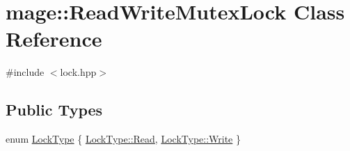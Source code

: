 \hypertarget{classmage_1_1_read_write_mutex_lock}{}\section{mage\+:\+:Read\+Write\+Mutex\+Lock Class Reference}
\label{classmage_1_1_read_write_mutex_lock}


{\ttfamily \#include $<$lock.\+hpp$>$}

\subsection*{Public Types}
\begin{DoxyCompactItemize}
\item 
enum \hyperlink{classmage_1_1_read_write_mutex_lock_a5fee0529edf58803ee1f5d4afa084a3b}{Lock\+Type} \{ \hyperlink{classmage_1_1_read_write_mutex_lock_a5fee0529edf58803ee1f5d4afa084a3ba7a1a5f3e79fdc91edf2f5ead9d66abb4}{Lock\+Type\+::\+Read}, 
\hyperlink{classmage_1_1_read_write_mutex_lock_a5fee0529edf58803ee1f5d4afa084a3ba1129c0e4d43f2d121652a7302712cff6}{Lock\+Type\+::\+Write}
 \}
\end{DoxyCompactItemize}
